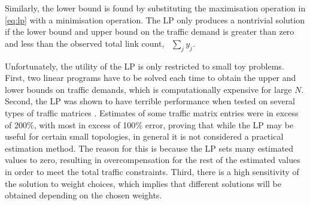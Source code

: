 \noindent Similarly, the lower bound is found by substituting the
maximisation operation in \eqref{eq:lp} with a minimisation operation.
The LP only produces a nontrivial solution if the lower bound and
upper bound on the traffic demand is greater than zero and less than
the observed total link count, \ie~$\sum_j y_j$.

Unfortunately, the utility of the LP is only restricted to small toy
problems. First, two linear programs have to be solved each time to
obtain the upper and lower bounds on traffic demands, which is
computationally expensive for large $N$.  Second, the LP was shown to have
terrible performance when tested on several types of traffic matrices
\cite{Medina02TMdirections}. Estimates of some traffic matrix entries
were in excess of 200$\%$, with most in excess of 100$\%$ error,
proving that while the LP may be useful for certain small topologies, in
general it is not considered a practical estimation method. The reason
for this is because the LP sets many estimated values to zero, resulting
in overcompensation for the rest of the estimated values in order to
meet the total traffic constraints. Third, there is a high sensitivity
of the solution to weight choices, which implies that different
solutions will be obtained depending on the chosen weights.

